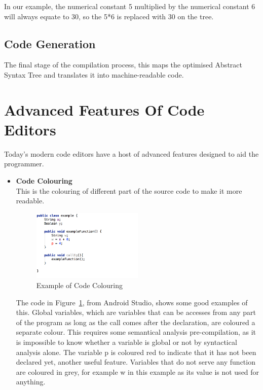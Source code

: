 \documentclass[ %
                    author={Jonathan Rankin},
                supervisor={Dr. David May, Dr. Ian Holyer},
                    degree={MEng},
                     title={CodeTouch},
                  subtitle={A Revolutionary Way To Program Real Code On Touch Screen Devices},
                      type={enterprise},
                      year={2015 } ]{dissertation}
\begin{document}
In our example, the numerical constant 5 multiplied by the numerical constant 6 will always equate to 30, so the 5*6 is replaced with 30 on the tree.


\subsection{Code Generation}
The final stage of the compilation process, this maps the optimised Abstract Syntax Tree and translates it into machine-readable code.
\newpage
\section{Advanced Features Of Code Editors}
Today's modern code editors have a host of advanced features designed to aid the programmer. 
\begin{itemize}
\item \textbf{Code Colouring} \\
This is the colouring of different part of the source code to make it more readable.

\begin{figure}[h]
\centering
\includegraphics[width=0.50\textwidth]{jcode}
\caption{Example of Code Colouring}
\label{fig:jcode}
\end{figure}
The code in Figure~\ref{fig:jcode}, from Android Studio, shows some good examples of this. Global variables, which are variables that can be accesses from any part of the program as long as the call comes after the declaration, are coloured a separate colour. This requires some semantical analysis pre-compilation, as it is impossible to know whether a variable is global or not by syntactical analysis alone. The variable p is coloured red to indicate that it has not been declared yet, another useful feature. Variables that do not serve any function are coloured in grey, for example w in this example as its value is not used for anything. 

\end{itemize}
\end{document}
